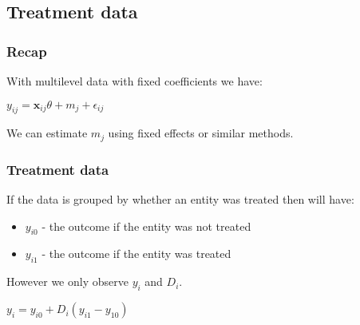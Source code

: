 
\subsection{Treatment data}

\subsubsection{Recap}

With multilevel data with fixed coefficients we have:

\(y_{ij}=\mathbf x_{ij}\theta +m_j + \epsilon_{ij}\)

We can estimate \(m_j\) using fixed effects or similar methods.

\subsubsection{Treatment data}

If the data is grouped by whether an entity was treated then will have:

\begin{itemize}
\item \(y_{i0}\) - the outcome if the entity was not treated
\item \(y_{i1}\) - the outcome if the entity was treated
\end{itemize}

However we only observe \(y_i\) and \(D_i\).

\(y_i=y_{i0}+D_i(y_{i1}-y_{10})\)

